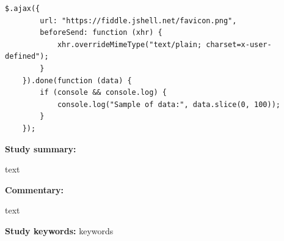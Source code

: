 \begin{lstlisting}[caption={\textit{AJAX request example~\cite{API.jQuery2022}}}, label={fig:ch2_ajaxBeforesend}]  
	$.ajax({
		url: "https://fiddle.jshell.net/favicon.png",
		beforeSend: function (xhr) {
			xhr.overrideMimeType("text/plain; charset=x-user-defined");
		}
	}).done(function (data) {
		if (console && console.log) {
			console.log("Sample of data:", data.slice(0, 100));
		}
	});
\end{lstlisting}

\begin{tcolorbox}[colback=gray!5!white, colframe=deepblue!80!black, title=Test\cite{Ogheneovo2014}]
	\begin{minipage}[t]{0.25\textwidth}
		\textbf{Study summary:}
	\end{minipage}
	\hfill
	\begin{minipage}[t]{0.65\textwidth}
		text
	\end{minipage}

	\vspace{0.75em} 

	\begin{minipage}[t]{0.25\textwidth}
		\textbf{Commentary:}
	\end{minipage}
	\hfill
	\begin{minipage}[t]{0.65\textwidth}
		text
	\end{minipage}
	\tcblower
	\textbf{Study keywords:} keywords
\end{tcolorbox}

